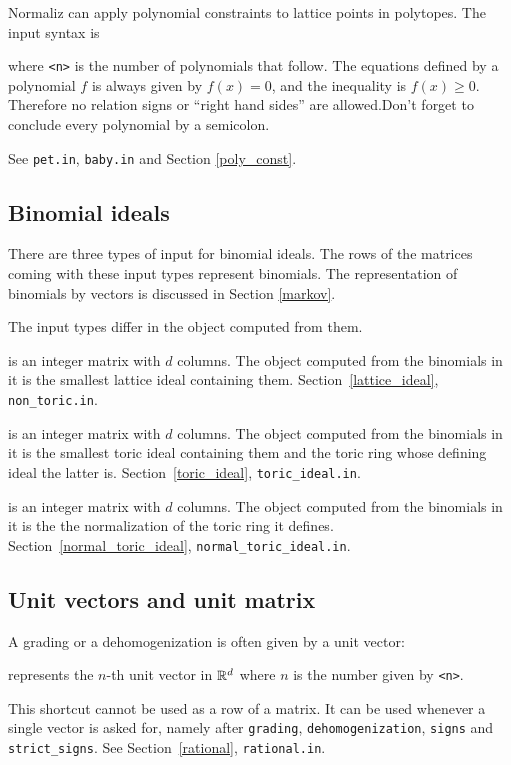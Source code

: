 Normaliz can apply polynomial constraints to lattice points in polytopes. The input syntax is

\begin{itemize}
\end{itemize}
where \verb|<n>| is the number of polynomials that follow. The equations defined by a polynomial $f$ is always given by $f(x)= 0$, and the inequality is $f(x) \ge 0$. Therefore no relation signs or ``right hand sides'' are allowed.Don't forget to conclude every polynomial by a semicolon.

See \verb|pet.in|, \verb|baby.in| and Section \ref{poly_const}.

\subsection{Binomial ideals}\label{relations}

There are three types of input for binomial ideals. The rows of the matrices coming with these input types represent binomials. The representation of binomials by vectors is discussed in Section \ref{markov}.

The input types differ in the object computed from them.

\begin{itemize}
	 is an integer matrix with $d$ columns. The object computed from the binomials in it is the smallest lattice ideal containing them. Section~\ref{lattice_ideal}, \verb|non_toric.in|.
	
	 is an integer matrix with $d$ columns. The object computed from the binomials in it is the smallest toric ideal containing them and the toric ring whose defining ideal the latter is. Section~\ref{toric_ideal}, \verb|toric_ideal.in|.
	
	 is an integer matrix with $d$ columns. The object computed from the binomials in it is the the normalization of the toric ring it defines. Section~\ref{normal_toric_ideal}, \verb|normal_toric_ideal.in|.
\end{itemize}

\subsection{Unit vectors and unit matrix}\label{unit_vectors}

A grading or a dehomogenization is often given by a unit vector:
\begin{itemize}
	 represents the $n$-th unit vector in ${\mathbb R}^d$ where $n$ is the number given by \verb|<n>|.
\end{itemize}
This shortcut cannot be used as a row of a matrix. It can be used whenever a single vector is asked for, namely after \verb|grading|, \verb|dehomogenization|, \verb|signs| and \verb|strict_signs|. See Section~\ref{rational}, \verb|rational.in|.

